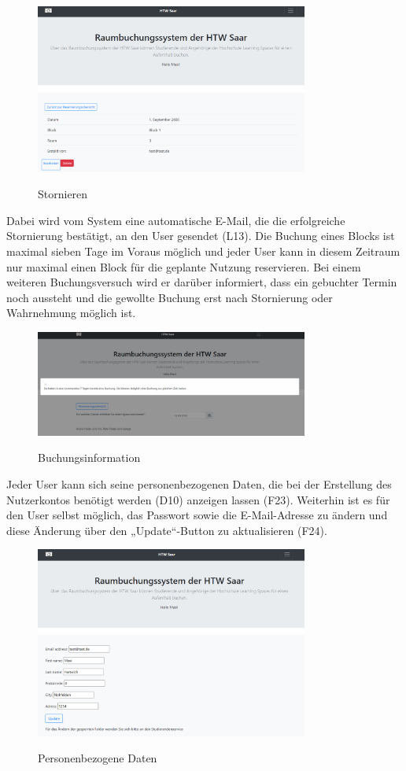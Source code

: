 \documentclass[a4paper,report,headsepline]{scrreprt}
\begin{document}
\begin{figure}[h]
    \centering
    \caption{Stornieren}
    \includegraphics[width=0.8\textwidth]{Stornieren}
    \label{fig:Stornieren}
\end{figure}
Dabei wird vom System eine automatische E-Mail, die die erfolgreiche Stornierung bestätigt, an den User gesendet (L13).
Die Buchung eines Blocks ist maximal sieben Tage im Voraus möglich und jeder User kann in diesem Zeitraum nur maximal einen Block für die geplante Nutzung reservieren. Bei einem weiteren Buchungsversuch wird er darüber informiert, dass ein gebuchter Termin noch aussteht und die gewollte Buchung erst nach Stornierung oder Wahrnehmung möglich ist.
\begin{figure}[h]
    \centering
    \caption{Buchungsinformation}
    \includegraphics[width=0.8\textwidth]{Buchungsinformation}
    \label{fig:Buchungsinformation}
\end{figure}
\clearpage
Jeder User kann sich seine personenbezogenen Daten, die bei der Erstellung des Nutzerkontos benötigt werden (D10) anzeigen lassen (F23). Weiterhin ist es für den User selbst möglich, das Passwort sowie die E-Mail-Adresse zu ändern und diese Änderung über den „Update“-Button zu aktualisieren (F24).
\begin{figure}[h]
    \centering
    \caption{Personenbezogene Daten}
    \includegraphics[width=0.8\textwidth]{Personenbezogene Daten}
    \label{fig:Personenbezogene Daten}
\end{figure}
\end{document}
